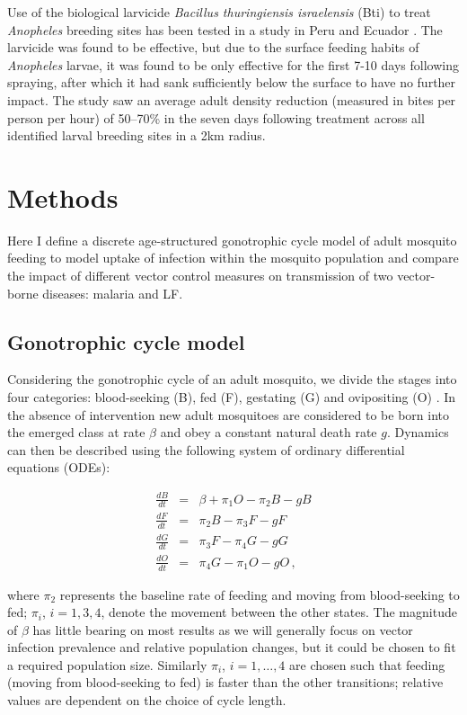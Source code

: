 Use of the biological larvicide \textit{Bacillus thuringiensis israelensis} (Bti) to treat \textit{Anopheles} breeding sites has been tested in a study in Peru and Ecuador \cite{Kroeger1995}. The larvicide was found to be effective, but due to the surface feeding habits of \textit{Anopheles} larvae, it was found to be only effective for the first 7-10 days following spraying, after which it had sank sufficiently below the surface to have no further impact. The study saw an average adult density reduction (measured in bites per person per hour) of 50--70\% in the seven days following treatment across all identified larval breeding sites in a 2km radius.

\section{Methods}

Here I define a discrete age-structured gonotrophic cycle model of adult mosquito feeding to model uptake of infection within the mosquito population and compare the impact of different vector control measures on transmission of two vector-borne diseases: malaria and LF.

\subsection{Gonotrophic cycle model}

Considering the gonotrophic cycle of an adult mosquito, we divide the stages into four categories: blood-seeking (B), fed (F), gestating (G) and ovipositing (O) \cite{killeen2016}. In the absence of intervention new adult mosquitoes are considered to be born into the emerged class at rate $\beta$ and obey a constant natural death rate $g$. Dynamics can then be described using the following system of ordinary differential equations (ODEs):


\begin{eqnarray}
\frac{dB}{dt} &=& \beta + \pi_1O - \pi_2B -g B \\
\frac{dF}{dt} &=& \pi_2B - \pi_3 F - g F \\
\frac{dG}{dt} &=& \pi_3F - \pi_4G - g G \\
\frac{dO}{dt} &=& \pi_4G - \pi_1O - g O \,,
\end{eqnarray}

where $\pi_2$ represents the baseline rate of feeding and moving from blood-seeking to fed; $\pi_i$, $i=1,3,4$, denote the movement between the other states. The magnitude of $\beta$ has little bearing on most results as we will generally focus on vector infection prevalence and relative population changes, but it could be chosen to fit a required population size. Similarly $\pi_i$, $i=1,\dots,4$ are chosen such that feeding (moving from blood-seeking to fed) is faster than the other transitions; relative values are dependent on the choice of cycle length.

